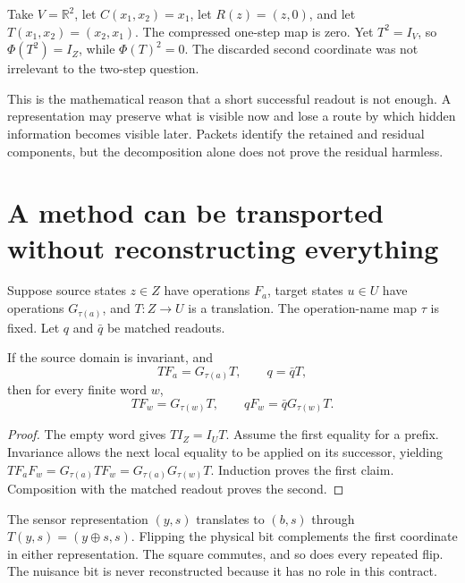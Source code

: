 \begin{counterexample}\label{ce:return}
Take $V=\mathbb R^2$, let $C(x_1,x_2)=x_1$, let $R(z)=(z,0)$, and let $T(x_1,x_2)=(x_2,x_1)$. The compressed one-step map is zero. Yet $T^2=I_V$, so $\Phi(T^2)=I_Z$, while $\Phi(T)^2=0$. The discarded second coordinate was not irrelevant to the two-step question.
\end{counterexample}

This is the mathematical reason that a short successful readout is not enough. A representation may preserve what is visible now and lose a route by which hidden information becomes visible later. Packets identify the retained and residual components, but the decomposition alone does not prove the residual harmless.

\section{A method can be transported without reconstructing everything}
Suppose source states $z\in Z$ have operations $F_a$, target states $u\in U$ have operations $G_{\tau(a)}$, and $T:Z\to U$ is a translation. The operation-name map $\tau$ is fixed. Let $q$ and $\bar q$ be matched readouts.

\begin{theorem}\label{r:transport}
If the source domain is invariant, and
\[
TF_a=G_{\tau(a)}T,\qquad q=\bar qT,
\]
then for every finite word $w$,
\[
TF_w=G_{\tau(w)}T,\qquad qF_w=\bar qG_{\tau(w)}T.
\]
\end{theorem}
\begin{proof}
The empty word gives $TI_Z=I_UT$. Assume the first equality for a prefix. Invariance allows the next local equality to be applied on its successor, yielding
$TF_aF_w=G_{\tau(a)}TF_w=G_{\tau(a)}G_{\tau(w)}T$.
Induction proves the first claim. Composition with the matched readout proves the second.
\end{proof}

The sensor representation $(y,s)$ translates to $(b,s)$ through $T(y,s)=(y\oplus s,s)$. Flipping the physical bit complements the first coordinate in either representation. The square commutes, and so does every repeated flip. The nuisance bit is never reconstructed because it has no role in this contract.

